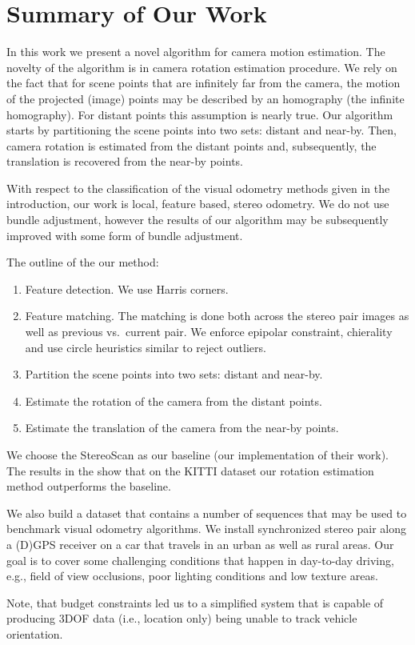\documentclass{report}
\begin{document}
\section{Summary of Our Work}
In this work we present a novel algorithm for camera motion
estimation.  The novelty of the algorithm is in camera rotation
estimation procedure.  We rely on the fact that for scene points that
are infinitely far from the camera, the motion of the projected
(image) points may be described by an homography (the infinite
homography). For distant points this assumption is nearly true.  Our
algorithm starts by partitioning the scene points into two sets:
distant and near-by. Then, camera rotation is estimated from the
distant points and, subsequently, the translation is recovered from
the near-by points.

With respect to the classification of the visual odometry methods
given in the introduction, our work is local, feature based, stereo
odometry.  We do not use bundle adjustment, however the results of our
algorithm may be subsequently improved with some form of bundle
adjustment.

The outline of the our method:
\begin{enumerate}
\item Feature detection.  We use Harris corners.
\item Feature matching. The matching is done both across the stereo
  pair images as well as previous vs.\ current pair.  We enforce
  epipolar constraint, chierality and use circle heuristics similar
  to reject outliers.
\item Partition the scene points into two sets: distant and near-by.
\item Estimate the rotation of the camera from the distant points.
\item Estimate the translation of the camera from the near-by points.
\end{enumerate}

We choose the StereoScan as our baseline (our implementation of their
work).  The results in the show that on the KITTI dataset our rotation
estimation method outperforms the baseline.

We also build a dataset that contains a number of sequences that may
be used to benchmark visual odometry algorithms.  We install
synchronized stereo pair along a (D)GPS receiver on a car that travels
in an urban as well as rural areas.  Our goal is to cover some
challenging conditions that happen in day-to-day driving, e.g., field
of view occlusions, poor lighting conditions and low texture areas.

Note, that budget constraints led us to a simplified system that is
capable of producing 3DOF data (i.e., location only) being unable to
track vehicle orientation.
\end{document}
